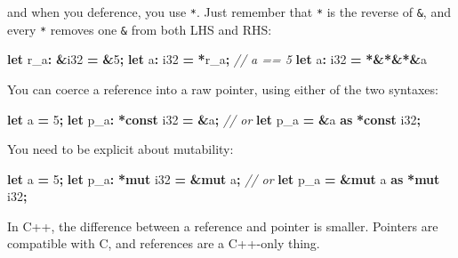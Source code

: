 \documentclass[
]{book}
\newenvironment{Shaded}{\begin{snugshade}}{\end{snugshade}}
\newcommand{\CommentTok}[1]{\textcolor[rgb]{0.56,0.35,0.01}{\textit{#1}}}
\newcommand{\DataTypeTok}[1]{\textcolor[rgb]{0.13,0.29,0.53}{#1}}
\newcommand{\DecValTok}[1]{\textcolor[rgb]{0.00,0.00,0.81}{#1}}
\newcommand{\KeywordTok}[1]{\textcolor[rgb]{0.13,0.29,0.53}{\textbf{#1}}}
\newcommand{\NormalTok}[1]{#1}
\newcommand{\OperatorTok}[1]{\textcolor[rgb]{0.81,0.36,0.00}{\textbf{#1}}}
\begin{document}
and when you deference, you use \texttt{*}. Just remember that \texttt{*} is the reverse of \texttt{\&}, and every \texttt{*} removes one \texttt{\&} from both LHS and RHS:

\begin{Shaded}
\begin{Highlighting}[]
\KeywordTok{let}\NormalTok{ r\_a}\OperatorTok{:} \OperatorTok{\&}\DataTypeTok{i32} \OperatorTok{=} \OperatorTok{\&}\DecValTok{5}\OperatorTok{;}
\KeywordTok{let}\NormalTok{   a}\OperatorTok{:}  \DataTypeTok{i32} \OperatorTok{=} \OperatorTok{*}\NormalTok{r\_a}\OperatorTok{;} \CommentTok{// a == 5}
\KeywordTok{let}\NormalTok{   a}\OperatorTok{:}  \DataTypeTok{i32} \OperatorTok{=} \OperatorTok{*\&*\&*\&}\NormalTok{a}
\end{Highlighting}
\end{Shaded}

You can coerce a reference into a raw pointer, using either of the two syntaxes:

\begin{Shaded}
\begin{Highlighting}[]
\KeywordTok{let}\NormalTok{ a }\OperatorTok{=} \DecValTok{5}\OperatorTok{;}
\KeywordTok{let}\NormalTok{ p\_a}\OperatorTok{:} \OperatorTok{*}\KeywordTok{const} \DataTypeTok{i32} \OperatorTok{=} \OperatorTok{\&}\NormalTok{a}\OperatorTok{;}
\CommentTok{// or}
\KeywordTok{let}\NormalTok{ p\_a }\OperatorTok{=} \OperatorTok{\&}\NormalTok{a }\KeywordTok{as} \OperatorTok{*}\KeywordTok{const} \DataTypeTok{i32}\OperatorTok{;}
\end{Highlighting}
\end{Shaded}

You need to be explicit about mutability:

\begin{Shaded}
\begin{Highlighting}[]
\KeywordTok{let}\NormalTok{ a }\OperatorTok{=} \DecValTok{5}\OperatorTok{;}
\KeywordTok{let}\NormalTok{ p\_a}\OperatorTok{:} \OperatorTok{*}\KeywordTok{mut} \DataTypeTok{i32} \OperatorTok{=} \OperatorTok{\&}\KeywordTok{mut}\NormalTok{ a}\OperatorTok{;}
\CommentTok{// or}
\KeywordTok{let}\NormalTok{ p\_a }\OperatorTok{=} \OperatorTok{\&}\KeywordTok{mut}\NormalTok{ a }\KeywordTok{as} \OperatorTok{*}\KeywordTok{mut} \DataTypeTok{i32}\OperatorTok{;}
\end{Highlighting}
\end{Shaded}

In C++, the difference between a reference and pointer is smaller. Pointers are
compatible with C, and references are a C++-only thing.
\end{document}
